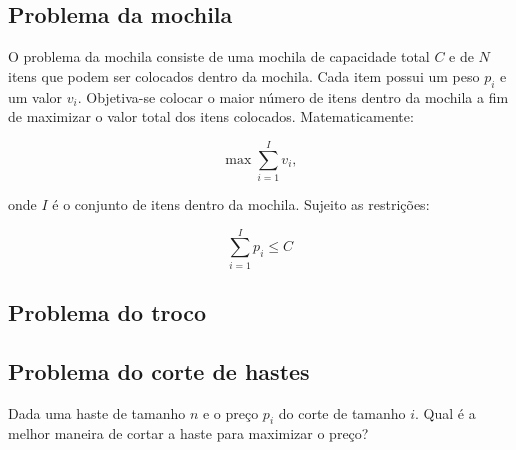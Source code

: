 \documentclass[a4paper,12pt]{article}
\begin{document}
\subsection{Problema da mochila}

\indent O problema da mochila consiste de uma mochila de capacidade total $C$ e de $N$ itens que podem ser colocados dentro da mochila. Cada item possui um peso $p_i$ e um valor $v_i$. Objetiva-se colocar o maior número de itens dentro da mochila a fim de maximizar o valor total dos itens colocados. Matematicamente:

\begin{equation}
    \max \sum\limits_{i=1}^{I}v_i,
\end{equation}

\noindent onde $I$ é o conjunto de itens dentro da mochila. Sujeito as restrições:

\begin{equation}
    \sum\limits_{i=1}^{I}p_i \leq C
\end{equation}

\subsection{Problema do troco}

\subsection{Problema do corte de hastes}

Dada uma haste de tamanho $n$ e o preço $p_i$ do corte de tamanho $i$. Qual é a melhor maneira de cortar a haste para maximizar o preço?

\end{document}
